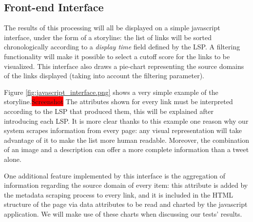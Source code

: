 \documentclass{sig-alternate}
\newcommand{\todo}[1]{\colorbox{red}{#1}}
\begin{document}
\subsection{Front-end Interface}
The results of this processing will all be displayed on a simple javascript interface, under the form of a storyline: the list of links will be sorted chronologically according to a \emph{display time} field defined by the LSP. A filtering functionality will make it possible to select a cutoff score for the links to be visualized. This interface also draws a pie-chart representing the source domains of the links displayed (taking into account the filtering parameter).

Figure \ref{fig:javascript_interface.png} shows a very simple example of the storyline.\todo{Screenshot} The attributes shown for every link must be interpreted according to the LSP that produced them, this will be explained after introducing each LSP. It is more clear thanks to this example one reason why our system scrapes information from every page: any visual representation will take advantage of it to make the list more human readable. Moreover, the combination of an image and a description can offer a more complete information than a tweet alone.

One additional feature implemented by this interface is the aggregation of information regarding the source domain of every item: this attribute is added by the metadata scraping process to every link, and it is included in the HTML structure of the page via data attributes to be read and charted by the javascript application. We will make use of these charts when discussing our tests' results.
\end{document}
